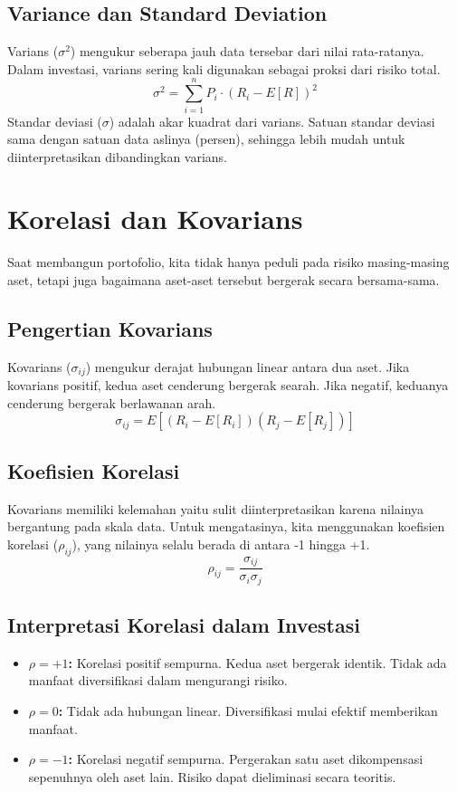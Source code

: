 \documentclass[12pt,a4paper]{book}
\begin{document}
\subsection{Variance dan Standard Deviation}
Varians ($\sigma^2$) mengukur seberapa jauh data tersebar dari nilai rata-ratanya. Dalam investasi, varians sering kali digunakan sebagai proksi dari risiko total.
\begin{equation}
    \sigma^2 = \sum_{i=1}^{n} P_i \cdot (R_i - E[R])^2
\end{equation}
Standar deviasi ($\sigma$) adalah akar kuadrat dari varians. Satuan standar deviasi sama dengan satuan data aslinya (persen), sehingga lebih mudah untuk diinterpretasikan dibandingkan varians.

\section{Korelasi dan Kovarians}
Saat membangun portofolio, kita tidak hanya peduli pada risiko masing-masing aset, tetapi juga bagaimana aset-aset tersebut bergerak secara bersama-sama.

\subsection{Pengertian Kovarians}
Kovarians ($\sigma_{ij}$) mengukur derajat hubungan linear antara dua aset. Jika kovarians positif, kedua aset cenderung bergerak searah. Jika negatif, keduanya cenderung bergerak berlawanan arah.
\begin{equation}
    \sigma_{ij} = E[(R_i - E[R_i])(R_j - E[R_j])]
\end{equation}

\subsection{Koefisien Korelasi}
Kovarians memiliki kelemahan yaitu sulit diinterpretasikan karena nilainya bergantung pada skala data. Untuk mengatasinya, kita menggunakan koefisien korelasi ($\rho_{ij}$), yang nilainya selalu berada di antara -1 hingga +1.
\begin{equation}
    \rho_{ij} = \frac{\sigma_{ij}}{\sigma_i \sigma_j}
\end{equation}

\subsection{Interpretasi Korelasi dalam Investasi}
\begin{itemize}
    \item \textbf{$\rho = +1$:} Korelasi positif sempurna. Kedua aset bergerak identik. Tidak ada manfaat diversifikasi dalam mengurangi risiko.
    \item \textbf{$\rho = 0$:} Tidak ada hubungan linear. Diversifikasi mulai efektif memberikan manfaat.
    \item \textbf{$\rho = -1$:} Korelasi negatif sempurna. Pergerakan satu aset dikompensasi sepenuhnya oleh aset lain. Risiko dapat dieliminasi secara teoritis.
\end{itemize}
\end{document}
